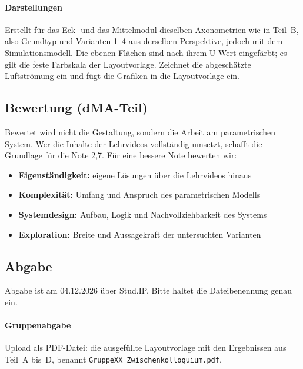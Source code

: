\paragraph{Darstellungen}
Erstellt für das Eck- und das Mittelmodul dieselben Axonometrien wie in Teil~B, also Grundtyp und Varianten 1–4 aus derselben Perspektive, jedoch mit dem Simulationsmodell. Die ebenen Flächen sind nach ihrem U-Wert eingefärbt; es gilt die feste Farbskala der Layoutvorlage. Zeichnet die abgeschätzte Luftströmung ein und fügt die Grafiken in die Layoutvorlage ein.
\subsection{Bewertung (dMA-Teil)}
Bewertet wird nicht die Gestaltung, sondern die Arbeit am parametrischen System. Wer die Inhalte der Lehrvideos vollständig umsetzt, schafft die Grundlage für die Note 2,7. Für eine bessere Note bewerten wir:
\begin{itemize}
  \item \textbf{Eigenständigkeit:} eigene Lösungen über die Lehrvideos hinaus
  \item \textbf{Komplexität:} Umfang und Anspruch des parametrischen Modells
  \item \textbf{Systemdesign:} Aufbau, Logik und Nachvollziehbarkeit des Systems
  \item \textbf{Exploration:} Breite und Aussagekraft der untersuchten Varianten
\end{itemize}
\subsection{Abgabe}
Abgabe ist am 04.12.2026 über Stud.IP. Bitte haltet die Dateibenennung genau ein.
\paragraph{Gruppenabgabe}
Upload als PDF-Datei: die ausgefüllte Layoutvorlage mit den Ergebnissen aus Teil~A bis~D, benannt \texttt{GruppeXX\_Zwischenkolloquium.pdf}.
